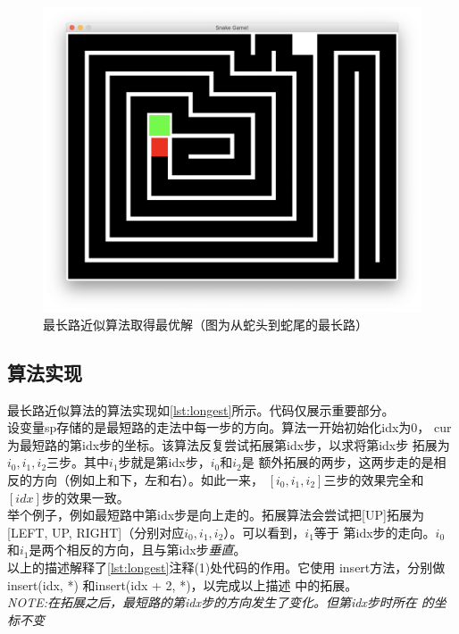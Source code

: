 \documentclass[a4paper]{article}
\begin{document}
\begin{figure}[!hbt]
\begin{minipage}{0.19\textwidth}
    \includegraphics[width=\linewidth]{assets/lp5.png}
\end{minipage}
    \caption{最长路近似算法取得最优解（图为从蛇头到蛇尾的最长路）} \label{fig:lp}
\end{figure}

\subsection{算法实现}
最长路近似算法的算法实现如\autoref{lst:longest}所示。代码仅展示重要部分。\\

设变量sp存储的是最短路的走法中每一步的方向。算法一开始初始化idx为0，
cur为最短路的第idx步的坐标。该算法反复尝试拓展第idx步，以求将第idx步
拓展为$i_0, i_1, i_2$三步。其中$i_1$步就是第idx步，$i_0$和$i_2$是
额外拓展的两步，这两步走的是相反的方向（例如上和下，左和右）。如此一来，
$[i_0, i_1, i_2]$三步的效果完全和$[idx]$步的效果一致。\\

举个例子，例如最短路中第idx步是向上走的。拓展算法会尝试把[UP]拓展为
[LEFT, UP, RIGHT]（分别对应$i_0, i_1, i_2$）。可以看到，$i_1$等于
第idx步的走向。$i_0$和$i_1$是两个相反的方向，且与第idx步\emph{垂直}。\\

以上的描述解释了\autoref{lst:longest}注释(1)处代码的作用。它使用
insert方法，分别做insert(idx, *) 和insert(idx + 2, *)，以完成以上描述
中的拓展。\\

\emph{NOTE:在拓展之后，最短路的第idx步的方向发生了变化。但第idx步时所在
的坐标不变}\\
\end{document}
